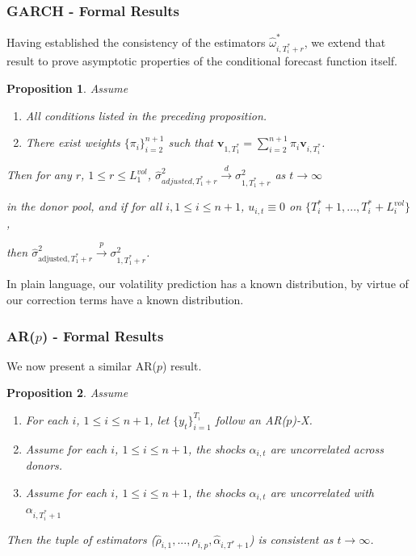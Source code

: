 \documentclass[9pt]{beamer}
\newcommand{\weight}{\pi}
\newtheorem{prop}{Proposition}
\theoremstyle{definition}
\begin{document}
    \begin{frame}\frametitle{GARCH - Formal Results} 

    Having established the consistency of the estimators $\hat\omega^{*}_{i,T_{i}^{*}+r}$, we extend that result to prove asymptotic properties of the conditional forecast function itself.
    
      \begin{prop}
        Assume
        \begin{enumerate}
          \item All conditions listed in the preceding proposition.
          \item There exist weights $\{\pi_{i}\}_{i=2}^{n+1}$ such that $\textbf{v}_{1,T_{1}^{*}} = \sum^{n+1}_{i=2}\weight_{i} \textbf{v}_{i,T_{i}^{*}}$.
         \end{enumerate}

      Then for any $r$, $1\leq r \leq L_{1}^{vol}$, $\hat\sigma^{2}_{adjusted,T_{1}^{*}+r}\overset{d}{\longrightarrow}\sigma^{2}_{1,T_{1}^{*}+r}$ as $t\rightarrow\infty$ 
      
    in the donor pool, and if for all $i, 1 \leq i \leq n+ 1$, $u_{i,t} \equiv 0$ on $\{T^{*}_{i}+1,... ,T^{*}_{i}+L_{i}^{vol}\}$, 
    
     then $\hat\sigma^{2}_{\text{adjusted},T_{1}^{*}+r}\overset{p}{\longrightarrow}\sigma^{2}_{1,T_{1}^{*}+r}$.

      \end{prop}

      In plain language, our volatility prediction has a known distribution, by virtue of our correction terms have a known distribution.

\end{frame}

\begin{frame}\frametitle{AR($p$) - Formal Results} 
    We now present a similar AR($p$) result.

\begin{prop}\label{ARIMA_param_consistency}
    Assume
    \begin{enumerate}
        \item For each $i$, $1\leq i \leq n + 1$, let $\{y_{t}\}^{T_{i}}_{i=1}$ follow an AR($p$)-X.
        \item Assume for each $i$, $1\leq i \leq n + 1$, the shocks $\alpha_{i,t}$ are uncorrelated across donors.
        \item Assume for each $i$, $1\leq i \leq n + 1$, the shocks $\alpha_{i,t}$ are uncorrelated with $\alpha_{i,T_{i}^{*}+1}$ 
    \end{enumerate}

    Then the tuple of estimators ($\hat\rho_{i,1},...,\hat\rho_{i, p}, \hat\alpha_{i,T^{*}+1}$) is consistent as $t \rightarrow \infty$.
\end{prop}

\end{frame}
\end{document}
